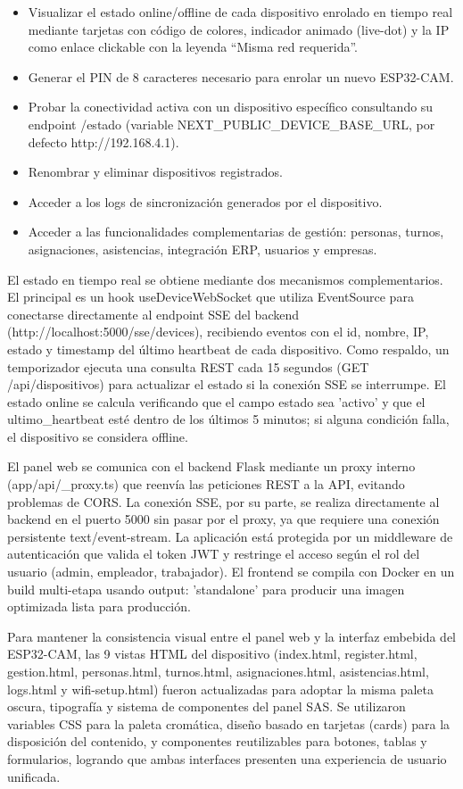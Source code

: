 \begin{itemize}
    \item Visualizar el estado online/offline de cada dispositivo enrolado en tiempo real mediante tarjetas con código de colores, indicador animado (live-dot) y la IP como enlace clickable con la leyenda ``Misma red requerida''.
    \item Generar el PIN de 8 caracteres necesario para enrolar un nuevo ESP32-CAM.
    \item Probar la conectividad activa con un dispositivo específico consultando su endpoint /estado (variable NEXT\_PUBLIC\_DEVICE\_BASE\_URL, por defecto http://192.168.4.1).
    \item Renombrar y eliminar dispositivos registrados.
    \item Acceder a los logs de sincronización generados por el dispositivo.
    \item Acceder a las funcionalidades complementarias de gestión: personas, turnos, asignaciones, asistencias, integración ERP, usuarios y empresas.
\end{itemize}

El estado en tiempo real se obtiene mediante dos mecanismos complementarios. El principal es un hook useDeviceWebSocket que utiliza EventSource para conectarse directamente al endpoint SSE del backend (http://localhost:5000/sse/devices), recibiendo eventos con el id, nombre, IP, estado y timestamp del último heartbeat de cada dispositivo. Como respaldo, un temporizador ejecuta una consulta REST cada 15 segundos (GET /api/dispositivos) para actualizar el estado si la conexión SSE se interrumpe. El estado online se calcula verificando que el campo estado sea 'activo' y que el ultimo\_heartbeat esté dentro de los últimos 5 minutos; si alguna condición falla, el dispositivo se considera offline.

El panel web se comunica con el backend Flask mediante un proxy interno (app/api/\_proxy.ts) que reenvía las peticiones REST a la API, evitando problemas de CORS. La conexión SSE, por su parte, se realiza directamente al backend en el puerto 5000 sin pasar por el proxy, ya que requiere una conexión persistente text/event-stream. La aplicación está protegida por un middleware de autenticación que valida el token JWT y restringe el acceso según el rol del usuario (admin, empleador, trabajador). El frontend se compila con Docker en un build multi-etapa usando output: 'standalone' para producir una imagen optimizada lista para producción.

Para mantener la consistencia visual entre el panel web y la interfaz embebida del ESP32-CAM, las 9 vistas HTML del dispositivo (index.html, register.html, gestion.html, personas.html, turnos.html, asignaciones.html, asistencias.html, logs.html y wifi-setup.html) fueron actualizadas para adoptar la misma paleta oscura, tipografía y sistema de componentes del panel SAS. Se utilizaron variables CSS para la paleta cromática, diseño basado en tarjetas (cards) para la disposición del contenido, y componentes reutilizables para botones, tablas y formularios, logrando que ambas interfaces presenten una experiencia de usuario unificada.

